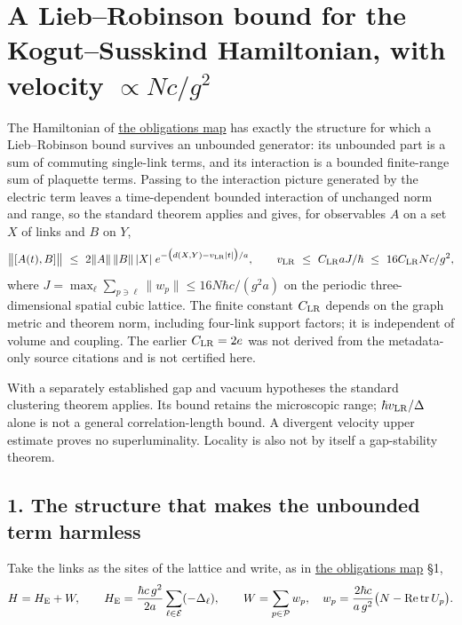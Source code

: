 \documentclass[11pt,a4paper]{article}
\begin{document}
\hypertarget{a-liebrobinson-bound-for-the-kogutsusskind-hamiltonian-with-velocity-propto-ncg2}{%
\section{\texorpdfstring{A Lieb--Robinson bound for the Kogut--Susskind
Hamiltonian, with velocity
\(\propto Nc/g^2\)}{A Lieb--Robinson bound for the Kogut--Susskind Hamiltonian, with velocity \textbackslash propto Nc/g\^{}2}}\label{a-liebrobinson-bound-for-the-kogutsusskind-hamiltonian-with-velocity-propto-ncg2}}

The Hamiltonian of \href{mass-gap-obligations-lattice.md}{the
obligations map} has exactly the structure for which a Lieb--Robinson
bound survives an unbounded generator: its unbounded part is a sum of
commuting single-link terms, and its interaction is a bounded
finite-range sum of plaquette terms. Passing to the interaction picture
generated by the electric term leaves a time-dependent bounded
interaction of unchanged norm and range, so the standard theorem applies
and gives, for observables \(A\) on a set \(X\) of links and \(B\) on
\(Y\), \[\big\|[A(t),B]\big\|\ \le\ 2\|A\|\,\|B\|\,|X|\;
e^{-\big(d(X,Y)-v_{\rm LR}|t|\big)/a},\qquad
v_{\rm LR}\ \le\ C_{\rm LR}aJ/\hbar\ \le\ 16C_{\rm LR}Nc/g^2,\] where
\(J=\max_\ell\sum_{p\ni\ell}\|w_p\|\le16N\hbar c/(g^2a)\) on the
periodic three-dimensional spatial cubic lattice. The finite constant
\(C_{\rm LR}\) depends on the graph metric and theorem norm, including
four-link support factors; it is independent of volume and coupling. The
earlier \(C_{\rm LR}=2e\) was not derived from the metadata-only source
citations and is not certified here.

With a separately established gap and vacuum hypotheses the standard
clustering theorem applies. Its bound retains the microscopic range;
\(\hbar v_{\rm LR}/\Delta\) alone is not a general correlation-length
bound. A divergent velocity upper estimate proves no superluminality.
Locality is also not by itself a gap-stability theorem.

\hypertarget{the-structure-that-makes-the-unbounded-term-harmless}{%
\subsection{1. The structure that makes the unbounded term
harmless}\label{the-structure-that-makes-the-unbounded-term-harmless}}

Take the links as the sites of the lattice and write, as in
\href{mass-gap-obligations-lattice.md}{the obligations map} §1,
\[H=H_{\rm E}+W,\qquad
H_{\rm E}=\frac{\hbar c\,g^2}{2a}\sum_{\ell\in\mathcal E}(-\Delta_\ell),\qquad
W=\sum_{p\in\mathcal P}w_p,\quad
w_p=\frac{2\hbar c}{a\,g^2}\big(N-\operatorname{Re}\operatorname{tr}U_p\big).\]
\end{document}
